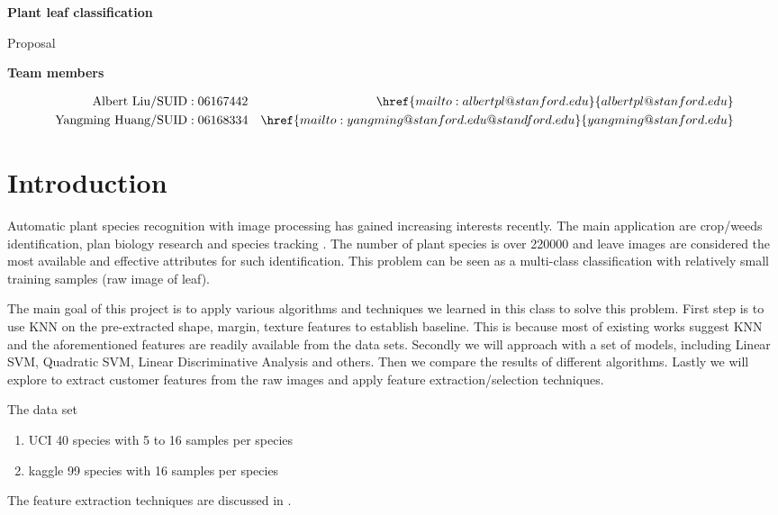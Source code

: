 \documentclass{article}
\begin{document}
{\Large \textbf{Plant leaf classification}\par}
{\Large Proposal\par}
\hrulefill \par
{\bf Team members\par}
\begin{align*}
\mathrm{Albert\ Liu/SUID: 06167442}
  &&\href{mailto:albertpl@stanford.edu}{albertpl@stanford.edu}\\
\mathrm{Yangming\ Huang/SUID: 06168334}
  &&\href{mailto:yangming@stanford.edu@standford.edu}{yangming@stanford.edu}\\
\end{align*}

\section{Introduction}
Automatic plant species recognition with image processing has gained increasing
interests recently. The main application are crop/weeds identification, plan
biology research and species tracking \cite{Pedro13}. The number of plant
species is over 220000 and leave images are considered the most available and
effective attributes for such identification.  This problem can be seen as a
multi-class classification with relatively small training samples (raw image of
leaf).

The main goal of this project is to apply various algorithms and techniques we
learned in this class to solve this problem. First step is to use KNN on the
pre-extracted {shape, margin, texture} features to establish baseline. This is
because most of existing works \cite{Charles13} \cite{Pedro13} suggest KNN and
the aforementioned features are readily available from the data sets.  Secondly
we will approach with a set of models, including Linear SVM, Quadratic SVM,
Linear Discriminative Analysis and others. Then we compare the results of
different algorithms. Lastly we will explore to extract customer features from
the raw images and apply feature extraction/selection techniques.

The data set
\begin{enumerate}
  \item UCI \cite{UCIDataSet} 40 species with 5 to 16 samples per species
  \item kaggle \cite{KaggleDataSet} 99 species with 16 samples per species
\end{enumerate}

The feature extraction techniques are discussed in \cite{Pedro13}.
\end{document}
